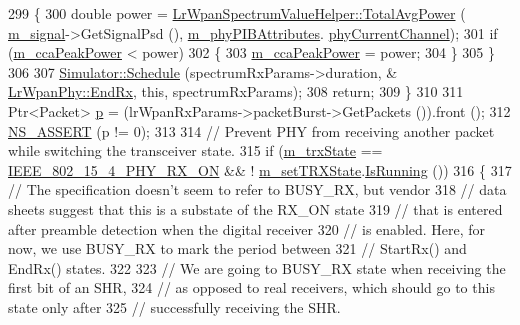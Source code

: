 \begin{DoxyCode}
299         \{
300           \textcolor{keywordtype}{double} power = \hyperlink{classns3_1_1LrWpanSpectrumValueHelper_ab8f05acfb68822f7b94fc637311fbda6}{LrWpanSpectrumValueHelper::TotalAvgPower} (
      \hyperlink{classns3_1_1LrWpanPhy_a923130b0bacef678012bcc8fdc68fd10}{m\_signal}->GetSignalPsd (), \hyperlink{classns3_1_1LrWpanPhy_a7f263bedbdeed627f7c5f2dab8e960c8}{m\_phyPIBAttributes}.
      \hyperlink{structns3_1_1LrWpanPhyPibAttributes_a8e620dfd0f5b45fa6c9525d93c498fcb}{phyCurrentChannel});
301           \textcolor{keywordflow}{if} (\hyperlink{classns3_1_1LrWpanPhy_a7b801d5943cf39ea427eb3cfd036166e}{m\_ccaPeakPower} < power)
302             \{
303               \hyperlink{classns3_1_1LrWpanPhy_a7b801d5943cf39ea427eb3cfd036166e}{m\_ccaPeakPower} = power;
304             \}
305         \}
306 
307       \hyperlink{classns3_1_1Simulator_a671882c894a08af4a5e91181bf1eec13}{Simulator::Schedule} (spectrumRxParams->duration, &
      \hyperlink{classns3_1_1LrWpanPhy_a3a6d92e9b81bb3209b990e6ab12f37b3}{LrWpanPhy::EndRx}, \textcolor{keyword}{this}, spectrumRxParams);
308       \textcolor{keywordflow}{return};
309     \}
310 
311   Ptr<Packet> \hyperlink{lte__link__budget_8m_ac9de518908a968428863f829398a4e62}{p} = (lrWpanRxParams->packetBurst->GetPackets ()).front ();
312   \hyperlink{assert_8h_a6dccdb0de9b252f60088ce281c49d052}{NS\_ASSERT} (p != 0);
313 
314   \textcolor{comment}{// Prevent PHY from receiving another packet while switching the transceiver state.}
315   \textcolor{keywordflow}{if} (\hyperlink{classns3_1_1LrWpanPhy_a316704a4eb96e04f4b960ba3577fe0ce}{m\_trxState} == \hyperlink{group__lr-wpan_gga6494269d13d45c511a07b7ccbb1de754a9480f69fea1a74b7961ed74d6b3e2f9e}{IEEE\_802\_15\_4\_PHY\_RX\_ON} && !
      \hyperlink{classns3_1_1LrWpanPhy_a0b82e7f96d0225c83489cf3dfb6058ce}{m\_setTRXState}.\hyperlink{classns3_1_1EventId_aabf8476d1a080c199ea0c6aa9ccea372}{IsRunning} ())
316     \{
317       \textcolor{comment}{// The specification doesn't seem to refer to BUSY\_RX, but vendor}
318       \textcolor{comment}{// data sheets suggest that this is a substate of the RX\_ON state}
319       \textcolor{comment}{// that is entered after preamble detection when the digital receiver}
320       \textcolor{comment}{// is enabled.  Here, for now, we use BUSY\_RX to mark the period between}
321       \textcolor{comment}{// StartRx() and EndRx() states.}
322 
323       \textcolor{comment}{// We are going to BUSY\_RX state when receiving the first bit of an SHR,}
324       \textcolor{comment}{// as opposed to real receivers, which should go to this state only after}
325       \textcolor{comment}{// successfully receiving the SHR.}

\end{DoxyCode}
